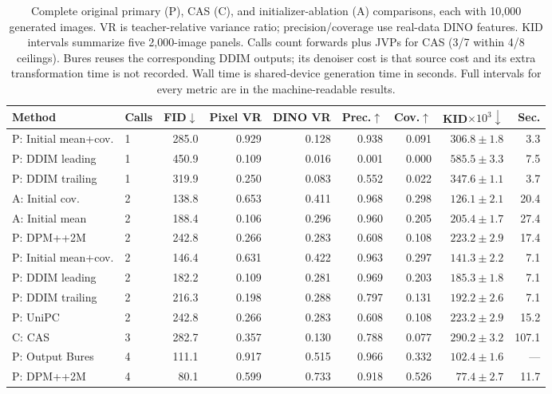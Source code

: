 \begin{table}[t]
\centering
\small
\setlength{\tabcolsep}{3.5pt}
\caption{Complete original primary (P), CAS (C), and initializer-ablation (A) comparisons, each with 10,000 generated images. VR is teacher-relative variance ratio; precision/coverage use real-data DINO features. KID intervals summarize five 2,000-image panels. Calls count forwards plus JVPs for CAS (3/7 within 4/8 ceilings). Bures reuses the corresponding DDIM outputs; its denoiser cost is that source cost and its extra transformation time is not recorded. Wall time is shared-device generation time in seconds. Full intervals for every metric are in the machine-readable results.}
\label{tab:cifar_allarms}
\begin{tabular}{llrrrrrrr}
\toprule
Method & Calls & FID$\downarrow$ & Pixel VR & DINO VR & Prec.$\uparrow$ & Cov.$\uparrow$ & KID$\times10^3\downarrow$ & Sec. \\
\midrule
P: Initial mean+cov. & 1 & 285.0 & 0.929 & 0.128 & 0.938 & 0.091 & $306.8\pm1.8$ & 3.3 \\
P: DDIM leading & 1 & 450.9 & 0.109 & 0.016 & 0.001 & 0.000 & $585.5\pm3.3$ & 7.5 \\
P: DDIM trailing & 1 & 319.9 & 0.250 & 0.083 & 0.552 & 0.022 & $347.6\pm1.1$ & 3.7 \\
A: Initial cov. & 2 & 138.8 & 0.653 & 0.411 & 0.968 & 0.298 & $126.1\pm2.1$ & 20.4 \\
A: Initial mean & 2 & 188.4 & 0.106 & 0.296 & 0.960 & 0.205 & $205.4\pm1.7$ & 27.4 \\
P: DPM++2M & 2 & 242.8 & 0.266 & 0.283 & 0.608 & 0.108 & $223.2\pm2.9$ & 17.4 \\
P: Initial mean+cov. & 2 & 146.4 & 0.631 & 0.422 & 0.963 & 0.297 & $141.3\pm2.2$ & 7.1 \\
P: DDIM leading & 2 & 182.2 & 0.109 & 0.281 & 0.969 & 0.203 & $185.3\pm1.8$ & 7.1 \\
P: DDIM trailing & 2 & 216.3 & 0.198 & 0.288 & 0.797 & 0.131 & $192.2\pm2.6$ & 7.1 \\
P: UniPC & 2 & 242.8 & 0.266 & 0.283 & 0.608 & 0.108 & $223.2\pm2.9$ & 15.2 \\
C: CAS & 3 & 282.7 & 0.357 & 0.130 & 0.788 & 0.077 & $290.2\pm3.2$ & 107.1 \\
P: Output Bures & 4 & 111.1 & 0.917 & 0.515 & 0.966 & 0.332 & $102.4\pm1.6$ & --- \\
P: DPM++2M & 4 & 80.1 & 0.599 & 0.733 & 0.918 & 0.526 & $77.4\pm2.7$ & 11.7 \\

\end{tabular}
\end{table}
